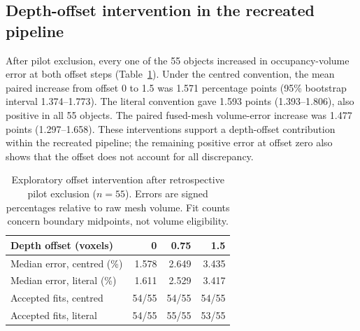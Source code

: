 \documentclass[journal]{IEEEtran}
\begin{document}
\subsection{Depth-offset intervention in the recreated pipeline}\label{sec:offsetres}

After pilot exclusion, every one of the 55 objects increased in occupancy-volume error at both offset steps (Table~\ref{tab:offset}). Under the centred convention, the mean paired increase from offset 0 to 1.5 was 1.571 percentage points (95\% bootstrap interval 1.374--1.773). The literal convention gave 1.593 points (1.393--1.806), also positive in all 55 objects. The paired fused-mesh volume-error increase was 1.477 points (1.297--1.658). These interventions support a depth-offset contribution within the recreated pipeline; the remaining positive error at offset zero also shows that the offset does not account for all discrepancy.

\begin{table}[t]
\centering
\caption{Exploratory offset intervention after retrospective pilot exclusion ($n=55$). Errors are signed percentages relative to raw mesh volume. Fit counts concern boundary midpoints, not volume eligibility.}
\label{tab:offset}
\begin{tabular}{lrrr}
\toprule
Depth offset (voxels) & 0 & 0.75 & 1.5 \\
\midrule
Median error, centred (\%) & 1.578 & 2.649 & 3.435 \\
Median error, literal (\%) & 1.611 & 2.529 & 3.417 \\
Accepted fits, centred & 54/55 & 54/55 & 54/55 \\
Accepted fits, literal & 54/55 & 55/55 & 53/55 \\
\bottomrule
\end{tabular}
\end{table}
\end{document}
